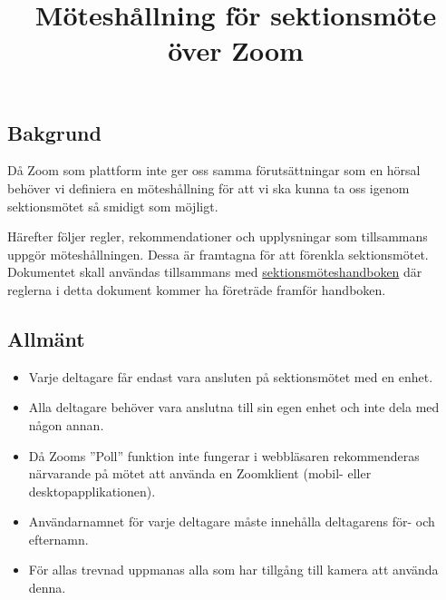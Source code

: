 \documentclass[11pt, noincludeaddress, nopagination]{classes/cthit}
\begin{document}
\title{Möteshållning för sektionsmöte över Zoom}

\titlelabel{\S \thetitle\quad}

\maketitle

\thispagestyle{empty}

\newpage

\makeheadfoot%

\setcounter{page}{1}

\vspace{-20pt}
\subsection*{Bakgrund}
Då Zoom som plattform inte ger oss samma förutsättningar som en hörsal behöver vi definiera en möteshållning för att vi ska kunna ta oss igenom sektionsmötet så smidigt som möjligt.

Härefter följer regler, rekommendationer och upplysningar som tillsammans uppgör möteshållningen. Dessa är framtagna för att förenkla sektionsmötet. Dokumentet skall användas tillsammans med \href{https://styrit.chalmers.it/wp-content/uploads/sektionsmoteshandbok.pdf}{sektionsmöteshandboken} där reglerna i detta dokument kommer ha företräde framför handboken.

\subsection*{Allmänt}
\begin{itemize}

    \item Varje deltagare får endast vara ansluten på sektionsmötet med en enhet.
    \item Alla deltagare behöver vara anslutna till sin egen enhet och inte dela med någon annan.
    \item Då Zooms ''Poll'' funktion inte fungerar i webbläsaren rekommenderas närvarande på mötet att använda en Zoomklient (mobil- eller desktopapplikationen).
    \item Användarnamnet för varje deltagare måste innehålla deltagarens för- och efternamn.
    \item För allas trevnad uppmanas alla som har tillgång till kamera att använda denna.
\end{itemize}
\end{document}
